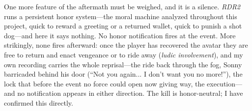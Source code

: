 One more feature of the aftermath must be weighed, and it is a silence. \textit{RDR2} runs a persistent honor system---the moral machine analyzed throughout this project, quick to reward a greeting or a returned wallet, quick to punish a shot dog---and here it says nothing. No honor notification fires at the event. More strikingly, none fires afterward: once the player has recovered the avatar they are free to return and enact vengeance or to ride away (\textit{ludic involvement}), and my own recording carries the whole reprisal---the ride back through the fog, Sonny barricaded behind his door (``Not you again... I don't want you no more!''), the lock that before the event no force could open now giving way, the execution---and no notification appears in either direction. The kill is honor-neutral; I have confirmed this directly.
